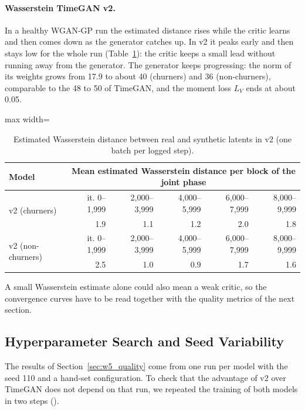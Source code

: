 \documentclass{article}
\begin{document}
\paragraph{Wasserstein TimeGAN v2.} In a healthy WGAN-GP run the estimated distance rises while the critic learns and then comes down as the generator catches up. In v2 it peaks early and then stays low for the whole run (Table~\ref{tab:w5_wdist}): the critic keeps a small lead without running away from the generator. The generator keeps progressing: the norm of its weights grows from 17.9 to about 40 (churners) and 36 (non-churners), comparable to the 48 to 50 of TimeGAN, and the moment loss $L_V$ ends at about 0.05.

\begin{table}[H]
\centering
\renewcommand{\arraystretch}{1.3}
\begin{adjustbox}{max width=\textwidth}
\begin{tabular}{|l|r|r|r|r|r|}
\hline
\textbf{Model} & \multicolumn{5}{c|}{\textbf{Mean estimated Wasserstein distance per block of the joint phase}} \\ \hline
\multirow{2}{*}{v2 (churners)} & it. 0--1{,}999 & 2{,}000--3{,}999 & 4{,}000--5{,}999 & 6{,}000--7{,}999 & 8{,}000--9{,}999 \\ \cline{2-6}
 & 1.9 & 1.1 & 1.2 & 2.0 & 1.8 \\ \hline
\multirow{2}{*}{v2 (non-churners)} & it. 0--1{,}999 & 2{,}000--3{,}999 & 4{,}000--5{,}999 & 6{,}000--7{,}999 & 8{,}000--9{,}999 \\ \cline{2-6}
 & 2.5 & 1.0 & 0.9 & 1.7 & 1.6 \\ \hline
\end{tabular}
\end{adjustbox}
\caption{Estimated Wasserstein distance between real and synthetic latents in v2 (one batch per logged step).}
\label{tab:w5_wdist}
\end{table}

A small Wasserstein estimate alone could also mean a weak critic, so the convergence curves have to be read together with the quality metrics of the next section.

\subsection{Hyperparameter Search and Seed Variability}
\label{sec:w5_robustness}

The results of Section~\ref{sec:w5_quality} come from one run per model with the seed 110 and a hand-set configuration. To check that the advantage of v2 over TimeGAN does not depend on that run, we repeated the training of both models in two steps ().
\end{document}
